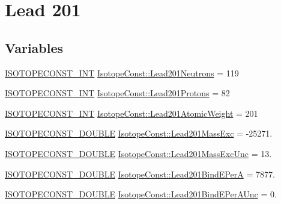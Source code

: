 \hypertarget{group___isotope_const-_lead-_pb201}{}\section{Lead 201}
\label{group___isotope_const-_lead-_pb201}
\subsection*{Variables}
\begin{DoxyCompactItemize}
\item 
\mbox{\hyperlink{group___isotope_const-_macros_ga5f18360b3e99483a35c32d789e62621c}{I\+S\+O\+T\+O\+P\+E\+C\+O\+N\+S\+T\+\_\+\+I\+NT}} \mbox{\hyperlink{group___isotope_const-_lead-_pb201_ga36b1caefe5db9f1a98a7c1e3ece789eb}{Isotope\+Const\+::\+Lead201\+Neutrons}} = 119
\item 
\mbox{\hyperlink{group___isotope_const-_macros_ga5f18360b3e99483a35c32d789e62621c}{I\+S\+O\+T\+O\+P\+E\+C\+O\+N\+S\+T\+\_\+\+I\+NT}} \mbox{\hyperlink{group___isotope_const-_lead-_pb201_ga65801cd7f476a07bb3f22913690df10b}{Isotope\+Const\+::\+Lead201\+Protons}} = 82
\item 
\mbox{\hyperlink{group___isotope_const-_macros_ga5f18360b3e99483a35c32d789e62621c}{I\+S\+O\+T\+O\+P\+E\+C\+O\+N\+S\+T\+\_\+\+I\+NT}} \mbox{\hyperlink{group___isotope_const-_lead-_pb201_gaa4a7c6bf0153b4d30152625c8d425f65}{Isotope\+Const\+::\+Lead201\+Atomic\+Weight}} = 201
\item 
\mbox{\hyperlink{group___isotope_const-_macros_ga8f45a7272ce02c0b4c65c44636ed719a}{I\+S\+O\+T\+O\+P\+E\+C\+O\+N\+S\+T\+\_\+\+D\+O\+U\+B\+LE}} \mbox{\hyperlink{group___isotope_const-_lead-_pb201_ga8b2b2f33b82cabb1cbe7f9123aca1e90}{Isotope\+Const\+::\+Lead201\+Mass\+Exc}} = -\/25271.
\item 
\mbox{\hyperlink{group___isotope_const-_macros_ga8f45a7272ce02c0b4c65c44636ed719a}{I\+S\+O\+T\+O\+P\+E\+C\+O\+N\+S\+T\+\_\+\+D\+O\+U\+B\+LE}} \mbox{\hyperlink{group___isotope_const-_lead-_pb201_ga03800ac56845b09b2fed2b2989f51edb}{Isotope\+Const\+::\+Lead201\+Mass\+Exc\+Unc}} = 13.
\item 
\mbox{\hyperlink{group___isotope_const-_macros_ga8f45a7272ce02c0b4c65c44636ed719a}{I\+S\+O\+T\+O\+P\+E\+C\+O\+N\+S\+T\+\_\+\+D\+O\+U\+B\+LE}} \mbox{\hyperlink{group___isotope_const-_lead-_pb201_ga13f400b5bc4ca406c0abf203b841f32b}{Isotope\+Const\+::\+Lead201\+Bind\+E\+PerA}} = 7877.
\item 
\mbox{\hyperlink{group___isotope_const-_macros_ga8f45a7272ce02c0b4c65c44636ed719a}{I\+S\+O\+T\+O\+P\+E\+C\+O\+N\+S\+T\+\_\+\+D\+O\+U\+B\+LE}} \mbox{\hyperlink{group___isotope_const-_lead-_pb201_gab512059cb590b3b5e84e77af5e016344}{Isotope\+Const\+::\+Lead201\+Bind\+E\+Per\+A\+Unc}} = 0.

\end{DoxyCompactItemize}
